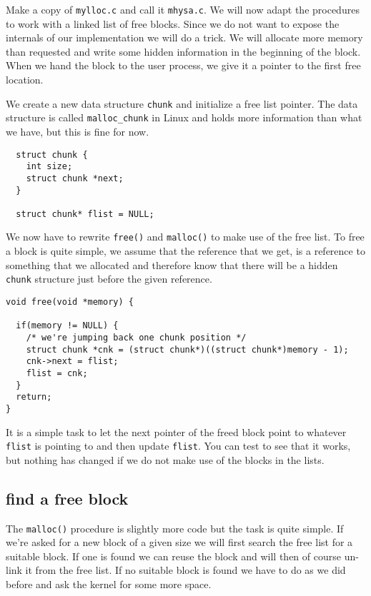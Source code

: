 \documentclass[a4paper,11pt]{article}
\begin{document}
Make a copy of {\tt mylloc.c} and call it {\tt mhysa.c}. We will now
adapt the procedures to work with a linked list of free blocks. Since
we do not want to expose the internals of our implementation we will
do a trick. We will allocate more memory than requested and write some
hidden information in the beginning of the block. When we hand the
block to the user process, we give it a pointer to the first free
location. 

We create a new data structure {\tt chunk} and initialize a free list
pointer. The data structure is called {\tt malloc\_chunk} in Linux and
holds more information than what we have, but this is fine for now.

\begin{lstlisting}
  struct chunk {
    int size;
    struct chunk *next;
  } 

  struct chunk* flist = NULL;
\end{lstlisting}

We now have to rewrite {\tt free()} and {\tt malloc()} to make use of
the free list. To free a block is quite simple, we assume that the
reference that we get, is a reference to something that we allocated
and therefore know that there will be a hidden {\tt chunk} structure 
just before the given reference. 

\begin{lstlisting}
void free(void *memory) {

  if(memory != NULL) {
    /* we're jumping back one chunk position */
    struct chunk *cnk = (struct chunk*)((struct chunk*)memory - 1);
    cnk->next = flist;
    flist = cnk;
  }
  return;
}
\end{lstlisting}

It is a simple task to let the next pointer of the freed block point
to whatever {\tt flist} is pointing to and then update {\tt flist}. You
can test to see that it works, but nothing has changed if we do not
make use of the blocks in the lists.

\subsection{find a free block}

The {\tt malloc()} procedure is slightly more code but the task is
quite simple. If we're asked for a new block of a given size we will
first search the free list for a suitable block. If one is found we
can reuse the block and will then of course un-link it from the free
list.  If no suitable block is found we have to do as we did before
and ask the kernel for some more space. 
\end{document}
